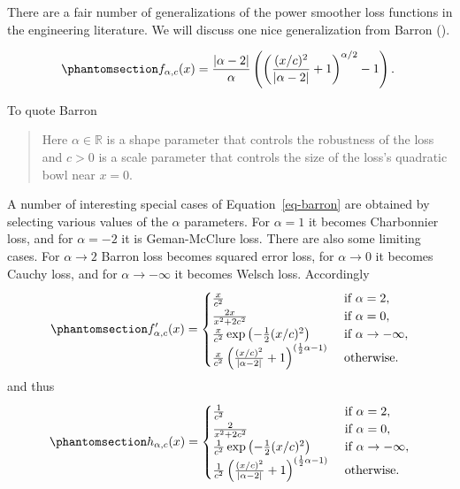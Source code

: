 \documentclass[
  12pt,
  letterpaper,
  DIV=11,
  numbers=noendperiod]{scrartcl}
\theoremstyle{definition}
\theoremstyle{definition}
\theoremstyle{plain}
\theoremstyle{plain}
\theoremstyle{plain}
\theoremstyle{remark}
\begin{document}
There are a fair number of generalizations of the power smoother loss
functions in the engineering literature. We will discuss one nice
generalization from Barron ().

\begin{equation}\phantomsection\label{eq-barron}{
f_{\alpha,c}(x)=\frac{|\alpha-2|}{\alpha}\left(\left(\frac{(x/c)^2}{|\alpha-2|}+1\right)^{\alpha/2}-1\right).\
}\end{equation}

To quote Barron

\begin{quote}
Here \(\alpha\in\mathbb{R}\) is a shape parameter that controls the
robustness of the loss and \(c>0\) is a scale parameter that controls
the size of the loss's quadratic bowl near \(x=0\).
\end{quote}

A number of interesting special cases of Equation~\ref{eq-barron} are
obtained by selecting various values of the \(\alpha\) parameters. For
\(\alpha=1\) it becomes Charbonnier loss, and for \(\alpha=-2\) it is
Geman-McClure loss. There are also some limiting cases. For
\(\alpha\rightarrow 2\) Barron loss becomes squared error loss, for
\(\alpha\rightarrow 0\) it becomes Cauchy loss, and for
\(\alpha\rightarrow-\infty\) it becomes Welsch loss. Accordingly
\begin{equation}\phantomsection\label{eq-barronf}{
f'_{\alpha,c}(x)=\begin{cases}
\frac{x}{c^2}&\text{ if }\alpha=2,\\
\frac{2x}{x^2+2c^2}&\text{ if }\alpha=0,\\
\frac{x}{c^2}\exp\left(-\frac12(x/c)^2\right)&\text{ if }\alpha\rightarrow-\infty,\\
\frac{x}{c^2}\left(\frac{(x/c)^2}{|\alpha-2|}+1\right)^{(\frac12\alpha-1)}&\text{ otherwise}.
\end{cases}
}\end{equation} and thus
\begin{equation}\phantomsection\label{eq-barronh}{
h_{\alpha,c}(x)=\begin{cases}
\frac{1}{c^2}&\text{ if }\alpha=2,\\
\frac{2}{x^2+2c^2}&\text{ if }\alpha=0,\\
\frac{1}{c^2}\exp\left(-\frac12(x/c)^2\right)&\text{ if }\alpha\rightarrow-\infty,\\
\frac{1}{c^2}\left(\frac{(x/c)^2}{|\alpha-2|}+1\right)^{(\frac12\alpha-1)}&\text{ otherwise}.
\end{cases}
}\end{equation}
\end{document}
